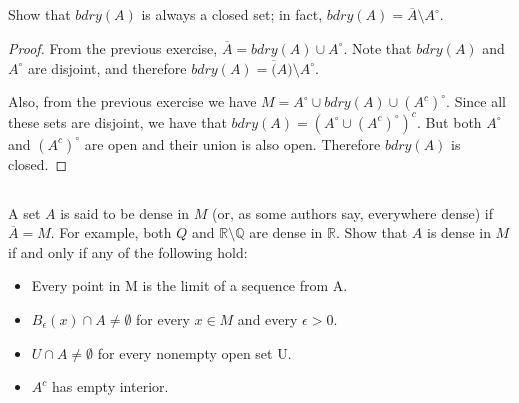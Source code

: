 \subsection{} Show that $bdry(A)$ is always a closed set;  in fact, $bdry(A) = \overline{A} \setminus  A^\circ$.

\begin{proof}
From the previous exercise, $\overline{A} = bdry(A) \cup A^\circ$. Note that $bdry(A)$ and $A^\circ$ are disjoint, and therefore $bdry(A) = \overline(A) \setminus A^\circ$.

Also, from the previous exercise we have $M = A^\circ \cup bdry(A) \cup (A^c)^\circ$. Since all these sets are disjoint, we have that $bdry(A) = (A^\circ \cup (A^c)^\circ)^c$. But both $A^\circ$ and $(A^c)^\circ$ are open and their union is also open. Therefore $bdry(A)$ is closed.

\end{proof}


\subsection{} A set $A$ is said to be dense in $M$ (or, as some authors say, everywhere dense) if $\overline{A} = M$. For example, both $Q$ and $\mathbb{R} \setminus \mathbb{Q}$ are dense in $\mathbb{R}$. Show that $A$ is dense in $M$ if and only if any of the following hold: 
\begin{itemize}
    \item Every point in M is the limit of a sequence from A. 
    \item $B_\epsilon(x) \cap A \neq \emptyset$ for every $x \in M$ and every $\epsilon > 0$.
    \item $U \cap A \neq \emptyset$ for every nonempty open set U.
    \item $A^c$ has empty interior. 
\end{itemize}

